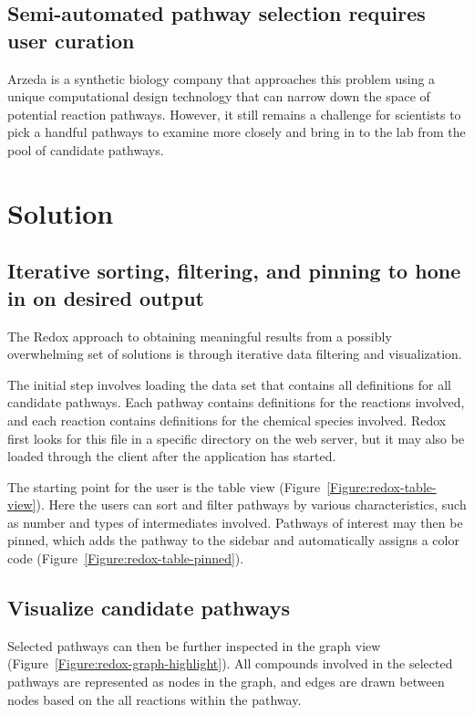 \subsection{Semi-automated pathway selection requires user curation}
Arzeda is a synthetic biology company that approaches this problem using a unique computational design technology that can narrow down the space of potential reaction pathways.
However, it still remains a challenge for scientists to pick a handful pathways to examine more closely and bring in to the lab from the pool of candidate pathways.


\section{Solution}

\subsection{Iterative sorting, filtering, and pinning to hone in on desired output}

The Redox approach to obtaining meaningful results from a possibly overwhelming set of solutions is through iterative data filtering and visualization.

The initial step involves loading the data set that contains all definitions for all candidate pathways.
Each pathway contains definitions for the reactions involved, and each reaction contains definitions for the chemical species involved.
Redox first looks for this file in a specific directory on the web server, but it may also be loaded through the client after the application has started.

The starting point for the user is the table view (Figure~\ref{Figure:redox-table-view}).
Here the users can sort and filter pathways by various characteristics, such as number and types of intermediates involved.
Pathways of interest may then be pinned, which adds the pathway to the sidebar and automatically assigns a color code (Figure~\ref{Figure:redox-table-pinned}).

\subsection{Visualize candidate pathways}

Selected pathways can then be further inspected in the graph view (Figure~\ref{Figure:redox-graph-highlight}).
All compounds involved in the selected pathways are represented as nodes in the graph, and edges are drawn between nodes based on the all reactions within the pathway.

